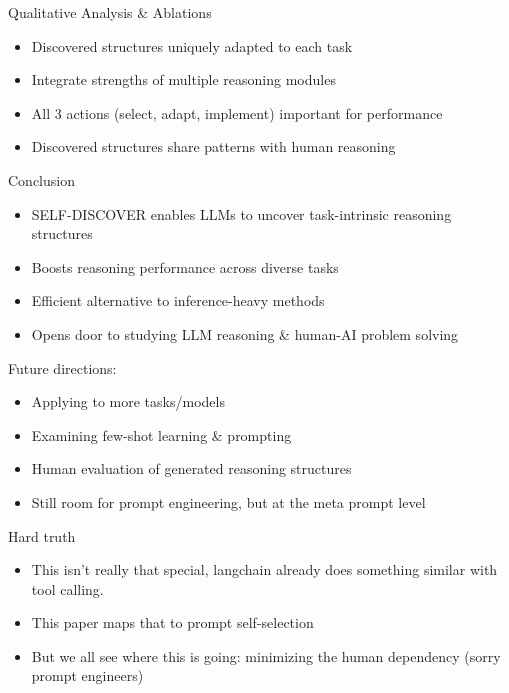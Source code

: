 \documentclass[aspectratio=169]{beamer}
\begin{document}
\begin{frame}{Qualitative Analysis & Ablations}
\begin{itemize}
\item Discovered structures uniquely adapted to each task \pause
\item Integrate strengths of multiple reasoning modules \pause
\item All 3 actions (select, adapt, implement) important for performance \pause
\item Discovered structures share patterns with human reasoning
\end{itemize}

\end{frame}

\begin{frame}{Conclusion}
\begin{itemize}
\item SELF-DISCOVER enables LLMs to uncover task-intrinsic reasoning structures \pause
\item Boosts reasoning performance across diverse tasks \pause
\item Efficient alternative to inference-heavy methods \pause
\item Opens door to studying LLM reasoning & human-AI problem solving \pause
\end{itemize}
Future directions:
\begin{itemize}
\item Applying to more tasks/models \pause
\item Examining few-shot learning & prompting \pause
\item Human evaluation of generated reasoning structures 
\item Still room for prompt engineering, but at the meta prompt level

\end{itemize}
\end{frame}

\begin{frame}{Hard truth}

\begin{itemize}
\item This isn't really that special, langchain already does something similar with tool calling. \pause 
\item This paper maps that to prompt self-selection \pause
\item But we all see where this is going: minimizing the human dependency (sorry prompt engineers)
\end{itemize}

\end{frame}
\end{document}
